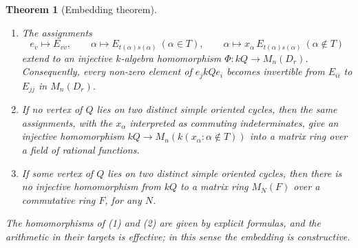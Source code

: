 \documentclass[12pt, a4paper]{report}
\theoremstyle{plain}
\newtheorem{theorem}{Theorem}[chapter]
\theoremstyle{definition}
\theoremstyle{remark}
\theoremstyle{plain}
\begin{document}
\begin{theorem}[Embedding theorem]\label{thm:embedding}
\begin{enumerate}
  \item The assignments
  \[ e_v\mapsto E_{vv},\qquad \alpha\mapsto E_{t(\alpha)s(\alpha)}\ (\alpha\in T),\qquad \alpha\mapsto x_\alpha\,E_{t(\alpha)s(\alpha)}\ (\alpha\notin T) \]
  extend to an injective $k$-algebra homomorphism $\Phi:kQ\to M_n(D_r)$. Consequently, every non-zero element of $e_jkQe_i$ becomes invertible from $E_{ii}$ to $E_{jj}$ in $M_n(D_r)$.
  \item If no vertex of $Q$ lies on two distinct simple oriented cycles, then the same assignments, with the $x_\alpha$ interpreted as \emph{commuting} indeterminates, give an injective homomorphism $kQ\to M_n(k(x_\alpha:\alpha\notin T))$ into a matrix ring over a field of rational functions.
  \item If some vertex of $Q$ lies on two distinct simple oriented cycles, then there is no injective homomorphism from $kQ$ to a matrix ring $M_N(F)$ over a commutative ring $F$, for any $N$.
\end{enumerate}
The homomorphisms of (1) and (2) are given by explicit formulas, and the arithmetic in their targets is effective; in this sense the embedding is constructive.
\end{theorem}
\end{document}
